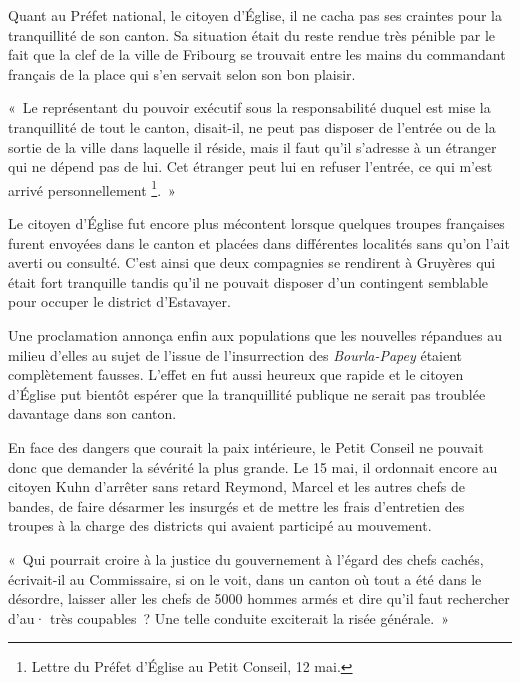 \documentclass[french,twoside]{book} %
\newenvironment{quoteblock}%
  {\begin{quoting}}
  {\end{quoting}}
\newenvironment{quotebar}{%
    \def\FrameCommand{{\color{rubric!10!}\vrule width 0.5em} \hspace{0.9em}}%
    \def\OuterFrameSep{\itemsep} %
    \MakeFramed {\advance\hsize-\width \FrameRestore}
  }%
  {%
    \endMakeFramed
  }
\renewenvironment{quoteblock}%
  {%
    \savenotes
    \setstretch{0.9}
    \normalfont
    \begin{quotebar}
  }
  {%
    \end{quotebar}
    \spewnotes
  }
\begin{document}
\noindent Quant au Préfet national, le citoyen d’Église, il ne cacha pas ses craintes pour la tranquillité de son canton. Sa situation était du reste rendue très pénible par le fait que la clef de la ville de Fribourg se trouvait entre les mains du commandant français de la place qui s’en servait selon son bon plaisir.\par

\begin{quoteblock}
 \noindent « Le représentant du pouvoir exécutif sous la responsabilité duquel est mise la tranquillité de tout le canton, disait-il, ne peut pas disposer de l’entrée ou de la sortie de la ville dans laquelle il réside, mais il faut qu’il s’adresse à un étranger qui ne dépend pas de lui. Cet étranger peut lui en refuser l’entrée, ce qui m’est arrivé personnellement \footnote{Lettre du Préfet d’Église au Petit Conseil, 12 mai.}. »
 \end{quoteblock}

\noindent Le citoyen d’Église fut encore plus mécontent lorsque quelques troupes françaises furent envoyées dans le canton et placées dans différentes localités sans qu’on l’ait averti ou consulté. C’est ainsi que deux compagnies se rendirent à Gruyères qui était fort tranquille tandis qu’il ne pouvait disposer d’un contingent semblable pour occuper le district d’Estavayer.\par
Une proclamation annonça enfin aux populations que les nouvelles répandues au milieu d’elles au sujet de l’issue de l’insurrection des \emph{Bourla-Papey} étaient complètement fausses. L’effet en fut aussi heureux que rapide et le citoyen d’Église put bientôt espérer que la tranquillité publique ne serait pas troublée davantage dans son canton.\par
En face des dangers que courait la paix intérieure, le Petit Conseil ne pouvait donc que demander la sévérité la plus grande. Le 15 mai, il ordonnait encore au citoyen Kuhn d’arrêter sans retard Reymond, Marcel et les autres chefs de bandes, de faire désarmer les insurgés et de mettre les frais d’entretien des troupes à la charge des districts qui avaient participé au mouvement.\par

\begin{quoteblock}
 \noindent « Qui pourrait croire à la justice du gouvernement à l’égard des chefs cachés, écrivait-il au Commissaire, si on le voit, dans un canton où tout a été dans le désordre, laisser aller les chefs de 5000 hommes armés et dire qu’il faut rechercher d’au· très coupables ? Une telle conduite exciterait la risée générale. »
 \end{quoteblock}
\end{document}
